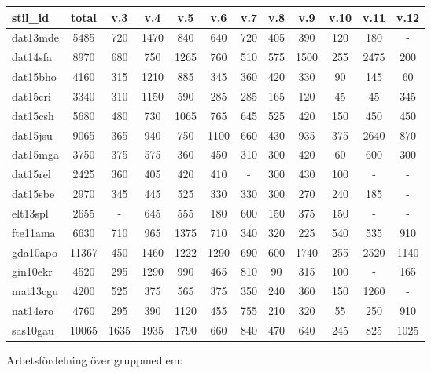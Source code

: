 \documentclass[paper=a4, fontsize=11pt,twoside]{article}
\begin{document}
\begin{figure}[h]
\centering
\caption{Arbetsfördelning över gruppmedlem:}
\begin{tabular}{|l|c|c|c|c|c|c|c|c|c|c|c|}
\hline
{\fontsize{8pt}{0.2cm}\selectfont stil\_id} & {\fontsize{8pt}{0.2cm}\selectfont
total} & {\fontsize{8pt}{0.2cm}\selectfont v.3} &
{\fontsize{8pt}{0.2cm}\selectfont v.4} & {\fontsize{8pt}{0.2cm}\selectfont v.5}
& {\fontsize{8pt}{0.2cm}\selectfont v.6} & {\fontsize{8pt}{0.2cm}\selectfont v.7}
& {\fontsize{8pt}{0.2cm}\selectfont v.8} & {\fontsize{8pt}{0.2cm}\selectfont v.9}
& {\fontsize{8pt}{0.2cm}\selectfont v.10} & {\fontsize{8pt}{0.2cm}\selectfont
v.11} & {\fontsize{8pt}{0.2cm}\selectfont v.12} \\
\hline
dat13mde & 5485 & 720 & 1470 & 840 & 640 & 720 & 405 & 390 & 120 & 180 & - \\
\hline
dat14sfa & 8970 & 680 & 750 & 1265 & 760 & 510 & 575 & 1500 & 255 & 2475 & 200
\\
\hline
dat15bho & 4160 & 315 & 1210 & 885 & 345 & 360 & 420 & 330 & 90 & 145 & 60 \\
\hline
dat15cri & 3340 & 310 & 1150 & 590 & 285 & 285 & 165 & 120 & 45 & 45 & 345 \\
\hline
dat15csh & 5680 & 480 & 730 & 1065 & 765 & 645 & 525 & 420 & 150 & 450 & 450 \\
\hline
dat15jsu & 9065 & 365 & 940 & 750 & 1100 & 660 & 430 & 935 & 375 & 2640 & 870 \\
\hline
dat15mga & 3750 & 375 & 575 & 360 & 450 & 310 & 300 & 420 & 60 & 600 & 300 \\
\hline
dat15rel & 2425 & 360 & 405 & 420 & 410 & - & 300 & 430 & 100 & - & - \\
\hline
dat15sbe & 2970 & 345 & 445 & 525 & 330 & 330 & 300 & 270 & 240 & 185 & - \\
\hline
elt13spl & 2655 & - & 645 & 555 & 180 & 600 & 150 & 375 & 150 & - & - \\
\hline
fte11ama & 6630 & 710 & 965 & 1375 & 710 & 340 & 320 & 225 & 540 & 535 & 910 \\
\hline
gda10apo & 11367 & 450 & 1460 & 1222 & 1290 & 690 & 600 & 1740 & 255 & 2520 &
1140
\\
\hline
gin10ekr & 4520 & 295 & 1290 & 990 & 465 & 810 & 90 & 315 & 100 & - & 165 \\
\hline
mat13cgu & 4200 & 525 & 375 & 565 & 375 & 350 & 240 & 360 & 150 & 1260 & - \\
\hline
nat14ero & 4760 & 295 & 390 & 1120 & 455 & 755 & 210 & 320 & 55 & 250 & 910 \\
\hline
sas10gau & 10065 & 1635 & 1935 & 1790 & 660 & 840 & 470 & 640 & 245 & 825 &
1025 \\
\hline
\end{tabular}
\end{figure}
\end{document}
